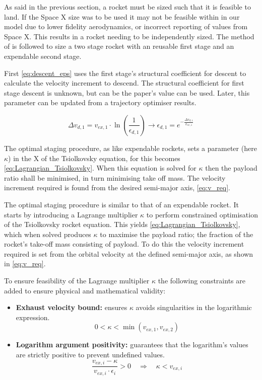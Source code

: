 As said in the previous section, a rocket must be sized such that it is feasible to land. If the Space X size was to be used it may not be feasible within in our model due to lower fidelity aerodynamics, or incorrect reporting of values from Space X. This results in a rocket needing to be independently sized. The method of \cite{ReusbaleStaging} is followed to size a two stage rocket with an reusable first stage and an expendable second stage.

First \autoref{eq:descent_eps} uses the first stage's structural coefficient for descent to calculate the velocity increment to descend. The structural coefficient for first stage descent is unknown, but can be the paper's value can be used. Later, this parameter can be updated from a trajectory optimiser results.

\begin{equation}
    \Delta v_{d,1} = v_{ex,1} \cdot \ln(\frac{1}{\epsilon_{d,1}}) \rightarrow \epsilon_{d,1} = e^{-\frac{\Delta v_{d,1}}{v_{ex,1}}}
\label{eq:descent_eps}
\end{equation}

The optimal staging procedure, as like expendable rockets, sets a parameter (here $\kappa$) in the X of the Tsiolkovsky equation, for \cite{ReusbaleStaging} this becomes \autoref{eq:Lagrangian_Tsiolkovsky}. When this equation is solved for $\kappa$ then the payload ratio shall be minimised, in turn minimising take off mass. The velocity increment required is found from the desired semi-major axis, \autoref{eq:v_req}.

The optimal staging procedure is similar to that of an expendable rocket. It starts by introducing a Lagrange multiplier $\kappa$ to perform constrained optimisation of the Tsiolkovsky rocket equation. This yields \autoref{eq:Lagrangian_Tsiolkovsky}, which when solved produces $\kappa$ to maximise the payload ratio; the fraction of the rocket's take-off mass consisting of payload. To do this the velocity increment required is set from the orbital velocity at the defined semi-major axis, as shown in \autoref{eq:v_req}.

To ensure feasibility of the Lagrange multiplier $\kappa$ the following constraints are added to ensure physical and mathematical validity:

\begin{itemize}
    \item \textbf{Exhaust velocity bound:} ensures $\kappa$ avoids singularities in the logarithmic expression.
    \[
    0 < \kappa < \min(v_{ex,1}, v_{ex,2})
    \]
    \item \textbf{Logarithm argument positivity:} guarantees that the logarithm's values are strictly positive to prevent undefined values.
    \[
    \frac{v_{ex,i} - \kappa}{v_{ex,i} \cdot \epsilon_i} > 0 \quad \Rightarrow \quad \kappa < v_{ex,i}
    \]
\end{itemize}


